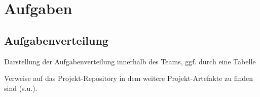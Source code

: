 \chapter{Aufgaben}

\section{Aufgabenverteilung}

    Darstellung der Aufgabenverteilung innerhalb des Teams, ggf. durch
    eine Tabelle

    Verweise auf das Projekt-Repository in dem weitere
    Projekt-Artefakte zu finden sind (s.u.).
